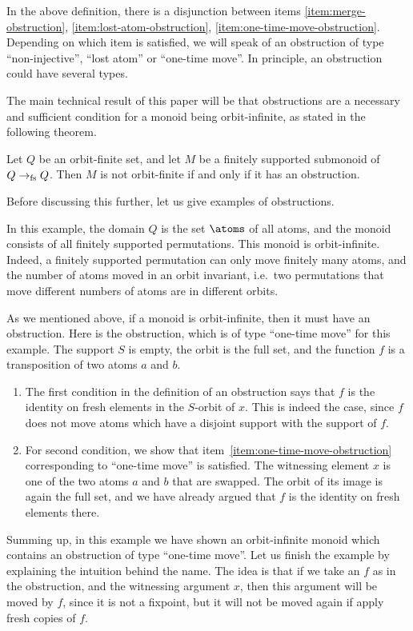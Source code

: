 In the above definition, there is a disjunction between items \ref{item:merge-obstruction}, \ref{item:lost-atom-obstruction}, \ref{item:one-time-move-obstruction}. Depending on which item is satisfied, we will speak of an obstruction of type ``non-injective'', ``lost atom'' or ``one-time move''. In principle, an obstruction could have several types.

The main technical result of this paper will be that obstructions are a necessary and sufficient condition for a monoid being orbit-infinite, as stated in the following theorem. 


\begin{theorem}\label{thm:obstructions-sound-and-complete}
    Let $Q$ be an orbit-finite set, and let $M$ be a finitely supported submonoid of $Q \to_{\text{fs}} Q$.
    Then $M$ is not orbit-finite if and only if it has an obstruction.
\end{theorem}

 Before discussing this further, let us give examples  of obstructions.
 

\begin{myexample} In this example, the domain $Q$ is the set $\atoms$ of all atoms, and the monoid consists of all finitely supported permutations. This monoid is orbit-infinite. Indeed, 
a finitely supported permutation can only move finitely many atoms, and the number of atoms moved in an orbit invariant, i.e.~two permutations that move different numbers of atoms are in different orbits.

As we mentioned above, if a monoid is orbit-infinite, then it must have an obstruction. Here is the obstruction, which is of type ``one-time move'' for this example. The support $S$ is empty, the orbit is the full set,  and the function $f$ is a transposition of two atoms $a$ and $b$.
\begin{enumerate}
    \item   The first condition in the definition of an obstruction says  that $f$ is the identity on fresh elements in the $S$-orbit of $x$.  This is indeed the case, since $f$ does not move atoms which have a disjoint support with the support of $f$.
    \item  For second condition, we show that item~\ref{item:one-time-move-obstruction} corresponding to ``one-time move'' is satisfied. The witnessing element $x$ is one of the two atoms $a$ and $b$ that are swapped. The orbit of its image is again the full set,  and we have already argued that $f$ is the identity on fresh elements there.  
\end{enumerate}
Summing up, in this example we have shown an orbit-infinite monoid which contains an obstruction of type ``one-time move''. Let us finish the example by explaining the intuition behind the name. The idea is that if we take an $f$ as in the obstruction, and the witnessing argument $x$, then this argument will be moved by $f$, since it is not a fixpoint, but it will not be moved again if apply fresh copies of $f$. 
\end{myexample}


